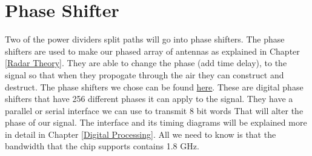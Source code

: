 \section{Phase Shifter}
Two of the power dividers split paths will go into phase shifters. The phase shifters are used to make our phased array
of antennas as explained in Chapter \ref{Radar Theory}. They are able to change the phase (add time delay), to the signal 
so that when they propogate through the air they can construct and destruct. The phase shifters we chose can be found
\href{https://www.digikey.com/en/products/detail/psemi/PE44820B-X/5822957}{here}. These are digital phase shifters that have 256
different phases it can apply to the signal. They have a parallel or serial interface we can use to transmit 8 bit words That
will alter the phase of our signal. The interface and its timing diagrams will be explained more in detail in Chapter \ref{Digital Processing}.
All we need to know is that the bandwidth that the chip supports contains 1.8 GHz.


